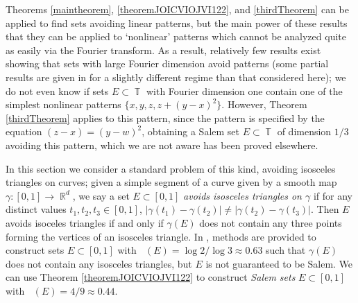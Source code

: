 \documentclass[dvipsnames,letterpaper,12pt]{article}
\numberwithin{equation}{section}
\DeclareMathOperator{\hausdim}{\dim_{\mathbb{H}}}
\DeclareMathOperator{\fordim}{\dim_{\mathbb{F}}}
\DeclareMathOperator{\RR}{\mathbb{R}}
\DeclareMathOperator{\TT}{\mathbb{T}}
\numberwithin{theorem}{section}
\begin{document}
Theorems \ref{maintheorem}, \ref{theoremJOICVIOJVI122}, and \ref{thirdTheorem} can be applied to find sets avoiding linear patterns, but the main power of these results that they can be applied to `nonlinear' patterns which cannot be analyzed quite as easily via the Fourier transform. As a result, relatively few results exist showing that sets with large Fourier dimension avoid patterns (some partial results are given in \cite{HenriotLabaPramanik} for a slightly different regime than that considered here); we do not even know if sets $E \subset \TT$ with Fourier dimension one contain one of the simplest nonlinear patterns $\{ x, y, z, z + (y - x)^2 \}$. However, Theorem \ref{thirdTheorem} applies to this pattern, since the pattern is specified by the equation $(z - x) = (y - w)^2$, obtaining a Salem set $E \subset \TT$ of dimension $1/3$ avoiding this pattern, which we are not aware has been proved elsewhere.

In this section we consider a standard problem of this kind, avoiding isosceles triangles on curves; given a simple segment of a curve given by a smooth map $\gamma : [0,1] \to \RR^d$, we say a set $E \subset [0,1]$ \emph{avoids isosceles triangles on $\gamma$} if for any distinct values $t_1,t_2,t_3 \in [0,1]$, $|\gamma(t_1) - \gamma(t_2)| \neq |\gamma(t_2) - \gamma(t_3)|$. Then $E$ avoids isoceles triangles if and only if $\gamma(E)$ does not contain any three points forming the vertices of an  isosceles triangle. In \cite{PramanikFraser}, methods are provided to construct sets $E \subset [0,1]$ with $\hausdim(E) = \log 2 / \log 3 \approx 0.63$ such that $\gamma(E)$ does not contain any isosceles triangles, but $E$ is not guaranteed to be Salem. We can use Theorem \ref{theoremJOICVIOJVI122} to construct \emph{Salem sets} $E \subset [0,1]$ with $\fordim(E) = 4/9 \approx 0.44$.
\end{document}
